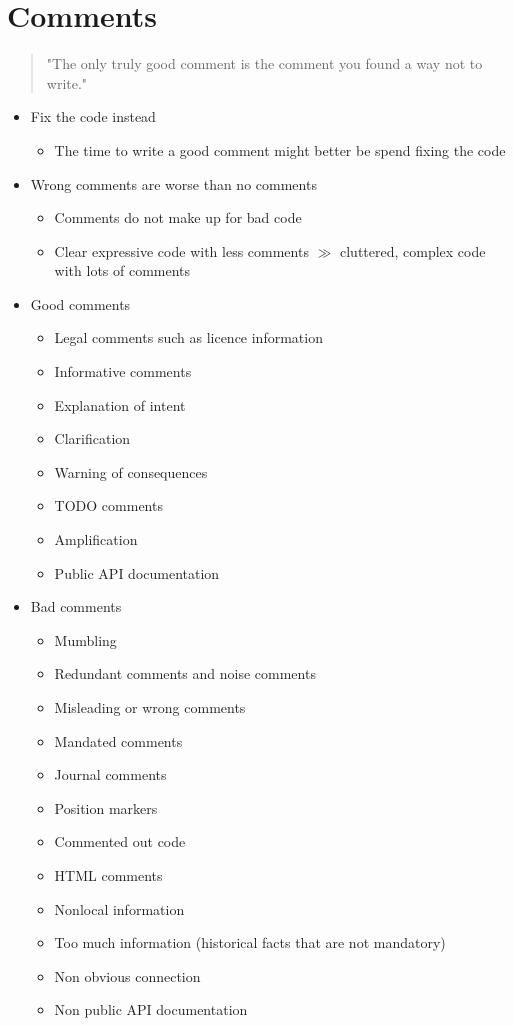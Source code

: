 
\section{Comments}
\begin{quote}
    "The only truly good comment is the comment you found a way not to write."
\end{quote}
\begin{itemize}
    \item Fix the code instead
    \begin{itemize}
        \item The time to write a good comment might better be spend fixing the code
    \end{itemize}
    \item Wrong comments are worse than no comments
    \begin{itemize}
        \item Comments do not make up for bad code
        \item Clear expressive code with less comments $\gg$ cluttered, complex code with lots of comments
    \end{itemize}
    \item Good comments
    \begin{itemize}
        \item Legal comments such as licence information
        \item Informative comments
        \item Explanation of intent
        \item Clarification
        \item Warning of consequences
        \item TODO comments
        \item Amplification
        \item Public API documentation
    \end{itemize}
    \item Bad comments
    \begin{itemize}
        \item Mumbling
        \item Redundant comments and noise comments
        \item Misleading or wrong comments
        \item Mandated comments
        \item Journal comments
        \item Position markers
        \item Commented out code
        \item HTML comments
        \item Nonlocal information
        \item Too much information (historical facts that are not mandatory)
        \item Non obvious connection
        \item Non public API documentation
    \end{itemize}
\end{itemize}